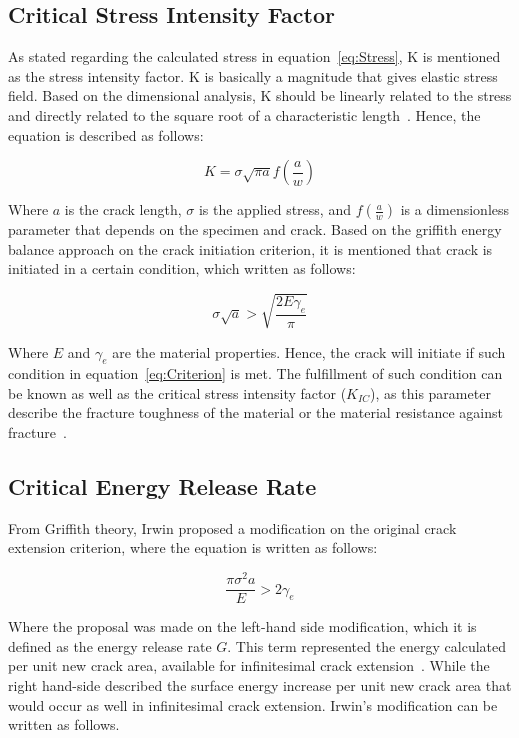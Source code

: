 \documentclass[12pt]{article}
\begin{document}
\subsection*{Critical Stress Intensity Factor}
\hspace{1em}As stated regarding the calculated stress in equation~\ref{eq:Stress}, K is mentioned as the stress intensity factor. K is basically a magnitude that gives elastic stress field.
Based on the dimensional analysis, K should be linearly related to the stress and directly related to the square root of a
characteristic length~\cite{Janssen.2002}. Hence, the equation is described as follows:

\begin{equation}
    K = \sigma \sqrt{\pi a} f(\frac{a}{w})
    \label{eq:SIF}
\end{equation}

Where $a$ is the crack length, $\sigma$ is the applied stress, and $f(\frac{a}{w})$ is a dimensionless parameter that depends 
on the specimen and crack. Based on the griffith energy balance approach on the crack initiation criterion, it is mentioned that crack is initiated in a certain condition, which written as follows:

\begin{equation}
    \sigma \sqrt{a} > \sqrt{\frac{2 E \gamma_e}{\pi}} 
    \label{eq:Criterion}
\end{equation}

Where $E$ and $\gamma_e$ are the material properties. Hence, the crack will initiate if such condition in equation~\ref{eq:Criterion} is met. The fulfillment of such condition
can be known as well as the critical stress intensity factor ($K_{IC}$), as this parameter describe the fracture toughness of the material or the material resistance against fracture~\cite{Zhu.2012}.   

\subsection*{Critical Energy Release Rate}
\hspace{1em} From Griffith theory, Irwin proposed a modification on the original crack extension criterion, where the equation is written as follows:

\begin{equation}
    \frac{\pi \sigma^2 a}{E} > 2 \gamma_e 
    \label{eq:Griffith}
\end{equation}

Where the proposal was made on the left-hand side modification, which it is defined as the energy release rate $G$. This term represented
the energy calculated per unit new crack area, available for infinitesimal crack extension~\cite{Janssen.2002}. While the right hand-side described the
surface energy increase per unit new crack area that would occur as well in infinitesimal crack extension. Irwin's modification can be written
as follows.
\end{document}
